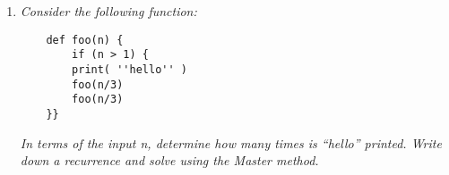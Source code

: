 \documentclass[12pt]{article} \setlength{\oddsidemargin}{0in}
\begin{document}
\begin{enumerate} [label=\textbf{\arabic*}.]
\begin{enumerate} [label=\textbf{\alph*})]
    
  \item \textit{$T(n)=T(n-1)+3^n$ if $n>1$ and $T(1)=3$} \\ %
  
$T(n)=T(n-1)+3^n\\
= T(n-2) + 3^{n-1} +3 ^n\\
= T(n-3) + 3^{n-2} +3^{n-1} +3 ^n\\
...\\
= \sum\limits_{i=0}^{i-1} 3^k  $ (using the same solution for the geometric summation as in 1.b) \\
 $\Rightarrow T(n) = \mathbf {\Theta(3^n)}$
    

  \item \textit{$T(n)=T(n^{1/4}+1)$ if $n>2$, and $T(n)=0$ otherwise} \\%

    $T(n)=T(n^{1/4}+1)\\
    = T(n^{1/16}+2)\\
    =T(n^{1/64}+3) \\
    ...\\
    T(n) = n^{\frac{1}{4^k}} + k\\$
    Using the base case $n^{\frac{1}{4^k}}  = 4\\
    = n^{\frac{1\cdot 4^k}{4^k}}  = 4^{4^k}\\
    = n = 4^{4^k}\\
    = log(n) = 4^k\\
    = log(log(n)) = k\\
    \Rightarrow T(n) = \mathbf {\Theta (log(log(n))} $
    
  \end{enumerate} \footnote{Worked with: George Allison, Eric Oropeza, Michael Merola, Gustav Solis, Krish Dholakiyq, Selena Quintanilla}
  
  \newpage
  
\item \textit{Consider the following function:}
  

\begin{verbatim}
    def foo(n) {
        if (n > 1) {
        print( ''hello'' )
        foo(n/3)
        foo(n/3)
    }}
\end{verbatim}

  \textit{In terms of the input n, determine how many times is
    ``hello'' printed. Write down a recurrence and solve using the
    Master method.}


\end{enumerate}
\end{document}
